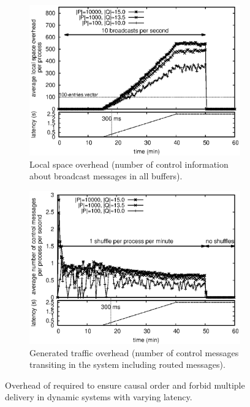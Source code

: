 \begin{figure}
  \begin{center}
    \begin{subfigure}[t]{0.49\textwidth}
    \includegraphics[width=1\textwidth]{./img/overhead.eps}
    \caption{\label{fig:overhead}Local space overhead (number of control
      information about broadcast messages in all buffers).}
    \end{subfigure}\hfill
    \begin{subfigure}[t]{0.49\textwidth}      
      \includegraphics[width=1\textwidth]{./img/controlmessages.eps}
      \caption{\label{fig:controlmessages}Generated traffic overhead (number of
        control messages transiting in the system including routed messages).}
    \end{subfigure}
    \caption{Overhead of \RPCBROADCAST required to ensure causal order and
      forbid multiple delivery in dynamic systems with varying latency.}
  \end{center}
\end{figure}



